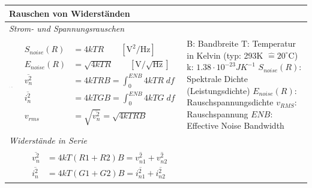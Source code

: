 \newpage
\begin{longtable}[t]{|p{4cm}|p{6.5cm}|p{7cm}|}
    \hline
    \multicolumn{3}{|l|}{\bf Rauschen von Widerständen}
    \\ \hline
    \multicolumn{3}{|l|}{\textit{Strom- und Spannungsrauschen}}
    \\ \hdashline
    \includegraphics[width=4cm, valign=t]{pictures/widerstandrauschen.png}
    & {	\vspace{-1.8\topsep}
        \begin{align*}
            S_{noise}(R) &=4kTR \qquad [\mathrm{V^2/Hz}]\\
            E_{noise}(R) &=\sqrt{4kTR} \qquad [\mathrm{V/\sqrt{Hz}}]\\
            \overline{v^2_{n}} &=4kTRB = \int_0^{ENB} 4kTR \; df\\
            \overline{i^2_{n}} &=4kTGB = \int_0^{ENB} 4kTG \; df\\
            v_{rms} &= \sqrt{\overline{v^2_{n}}} = \sqrt{4kTRB}
        \end{align*}
      }
    & {B: Bandbreite\newline
       T:  Temperatur in Kelvin (typ: 293K $\hat{=}20^{\circ}$C)\newline
       k:  $1.38 \cdot 10^{-23}JK^{-1}$\newline
       $S_{noise}(R)$:  Spektrale Dichte (Leistungsdichte)\newline
       $E_{noise}(R)$: Rauschspannungsdichte\newline
       $v_{RMS}$:  Rauschspannung\newline
       $ENB$: Effective Noise Bandwidth
      }
    \\ \hline
    \multicolumn{3}{|l|}{\textit{Widerstände in Serie}}
    \\ \hdashline
    
    & {	\vspace{-1.6\topsep}
        \begin{align*}
            \overline{v^2_{n}}&=4kT(R1+R2)B=\overline{v^2_{n1}}+\overline{v^2_{n2}}\\
            \overline{i^2_{n}}&=4kT(G1+G2)B=\overline{i^2_{n1}}+\overline{i^2_{n2}}
        \end{align*}
    }
    & 
    \\ \hline
\end{longtable}
